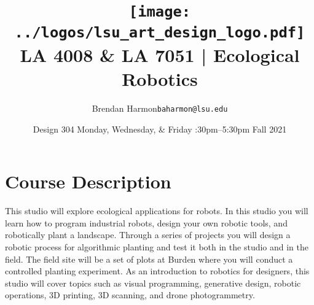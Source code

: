 \documentclass[11pt,article,oneside]{memoir}
\makeatletter
\def\myauthor{Author}
\def\mytitle{Title}
\def\myemail{baharmon@lsu.edu}
\def\myauthor{\normalsize Brendan Harmon}
\def\mytitle{
\texttt{[image: ../logos/lsu\_art\_design\_logo.pdf]}
\vspace*{0.5cm}
\\[0.1cm] {\normalfont \normalsize LA 4008 \& LA 7051 |} \Large Ecological Robotics
}
\newcommand{\globalcolor}[1]{%
  \color{#1}\global\let\default@color\current@color
}
\makeatother
\begin{document}
\setlength\bibitemsep{0.5em}

\setmainfont[Scale=1, Path = ../fonts/lato/,BoldItalicFont=Lato-RegIta,BoldFont=Lato-Reg,ItalicFont=Lato-LigIta]{Lato-Lig}
\setsansfont[Scale=1, Path = ../fonts/lato/,BoldItalicFont=Lato-RegIta,BoldFont=Lato-Reg,ItalicFont=Lato-LigIta]{Lato-Lig}
\setmonofont[Mapping=tex-text,Scale=0.8,Path = ../fonts/inconsolata/]{i}

\def\ind{\hangindent=1 true cm\hangafter=1 \noindent}
\def\labelitemi{$\cdot$}

\title{\LARGE \mytitle}
\author{\Large\myauthor \newline \footnotesize\texttt{\noindent\myemail}}
\date{ \footnotesize Design 304 
\newline Monday, Wednesday, \& Friday
:30pm--5:30pm
\newline Fall 2021}
\published{\,}


\globalcolor{black}
\vspace*{-10em}
\maketitle
\vspace*{1cm}
\clearpage



\globalcolor{black}

\vspace*{-10em}
\maketitle

\section{Course Description}
This studio will explore ecological applications for robots. In this studio you will learn how to program industrial robots, design your own robotic tools, and robotically plant a landscape. Through a series of projects you will design a robotic process for algorithmic planting and test it both in the studio and in the field. The field site will be a set of plots at Burden where you will conduct a controlled planting experiment. As an introduction to robotics for designers, this studio will cover topics such as visual programming, generative design, robotic operations, 3D printing, 3D scanning, and drone photogrammetry. \\
\end{document}
